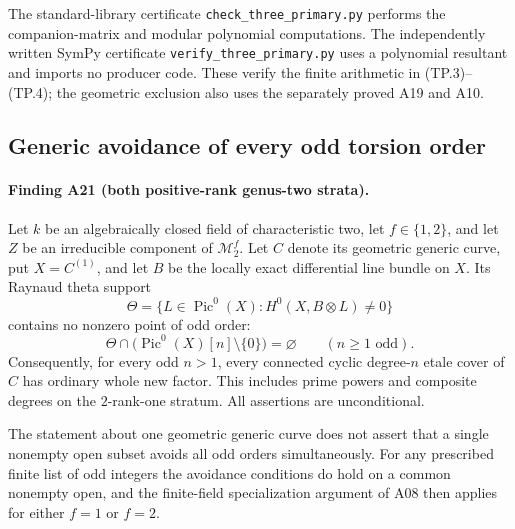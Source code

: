\documentclass[11pt,a4paper]{article}
\begin{document}
The standard-library certificate \texttt{check\_three\_primary.py}
performs the companion-matrix and modular polynomial computations.
The independently written SymPy certificate
\texttt{verify\_three\_primary.py} uses a polynomial resultant
and imports no producer code. These verify the finite arithmetic
in (TP.3)--(TP.4); the geometric exclusion also uses the separately
proved A19 and A10.


\subsection{Generic avoidance of every odd torsion order}
\label{sec:generic-all-odd}

\paragraph{Finding A21 (both positive-rank genus-two strata).}
Let $k$ be an algebraically closed field of characteristic two,
let $f\in\{1,2\}$, and let $Z$ be an irreducible component of
$\mathcal M_2^f$.  Let $C$ denote its geometric generic curve,
put $X=C^{(1)}$, and let $B$ be the locally exact differential
line bundle on $X$.  Its Raynaud theta support
\[
 \Theta=\{L\in\operatorname{Pic}^0(X):
                       H^0(X,B\otimes L)\ne0\}
\]
contains no nonzero point of odd order:
\[
 \Theta\cap
 \bigl(\operatorname{Pic}^0(X)[n]\setminus\{0\}\bigr)
             =\varnothing\qquad(n\ge1\text{ odd}).             \tag{GO.1}
\]
Consequently, for every odd $n>1$, every connected cyclic
degree-$n$ etale cover of $C$ has ordinary whole new factor.
This includes prime powers and composite degrees on the
$2$-rank-one stratum.  All assertions are unconditional.

The statement about one geometric generic curve does not
assert that a single nonempty open subset avoids all odd
orders simultaneously.  For any prescribed finite list of
odd integers the avoidance conditions do hold on a common
nonempty open, and the finite-field specialization argument
of A08 then applies for either $f=1$ or $f=2$.
\end{document}
